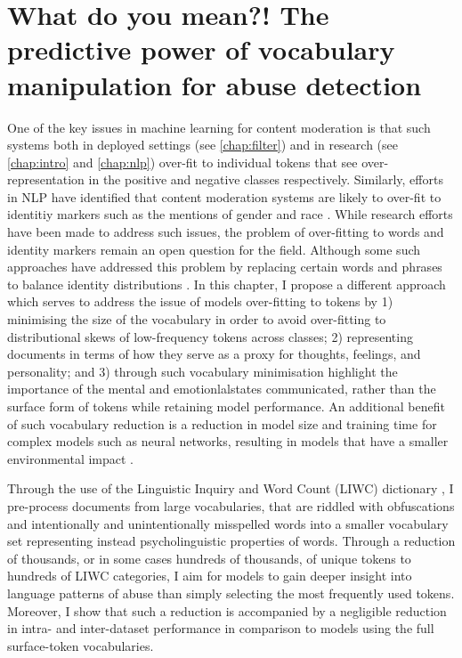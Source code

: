 \ifpdf
    \graphicspath{{Chapter4/Figs/Raster/}{Chapter4/Figs/PDF/}{Chapter4/Figs/}}
\else
    \graphicspath{{Chapter4/Figs/Vector/}{Chapter4/Figs/}}
\fi

\chapter{What do you mean?! The predictive power of vocabulary manipulation for abuse detection}\label{chap:liwc}

One of the key issues in machine learning for content moderation is that such systems both in deployed settings (see \cref{chap:filter}) and in research (see \cref{chap:intro} and \cref{chap:nlp}) over-fit to individual tokens that see over-representation in the positive and negative classes respectively. 
Similarly, efforts in NLP have identified that content moderation systems are likely to over-fit to identitiy markers such as the mentions of gender and race \citep{Dixon:2018}.
While research efforts have been made to address such issues, the problem of over-fitting to words and identity markers remain an open question for the field. Although some such approaches have addressed this problem by replacing certain words and phrases to balance identity distributions \cite{Dixon:2018}. In this chapter, I propose a different approach which serves to address the issue of models over-fitting to tokens by 1) minimising the size of the vocabulary in order to avoid over-fitting to distributional skews of low-frequency tokens across classes; 2) representing documents in terms of how they serve as a proxy for thoughts, feelings, and personality; and 3) through such vocabulary minimisation highlight the importance of the mental and emotionlalstates communicated, rather than the surface form of tokens while retaining model performance. An additional benefit of such vocabulary reduction is a reduction in model size and training time for complex models such as neural networks, resulting in models that have a smaller environmental impact \citep{Strubell:2019}.

Through the use of the Linguistic Inquiry and Word Count (LIWC) dictionary \cite{LIWC:2015,Pennebaker:2001}, I pre-process documents from large vocabularies, that are riddled with obfuscations and intentionally and unintentionally misspelled words into a smaller vocabulary set representing instead psycholinguistic properties of words. Through a reduction of thousands, or in some cases hundreds of thousands, of unique tokens to hundreds of LIWC categories, I aim for models to gain deeper insight into language patterns of abuse than simply selecting the most frequently used tokens. Moreover, I show that such a reduction is accompanied by a negligible reduction in intra- and inter-dataset performance in comparison to models using the full surface-token vocabularies.


